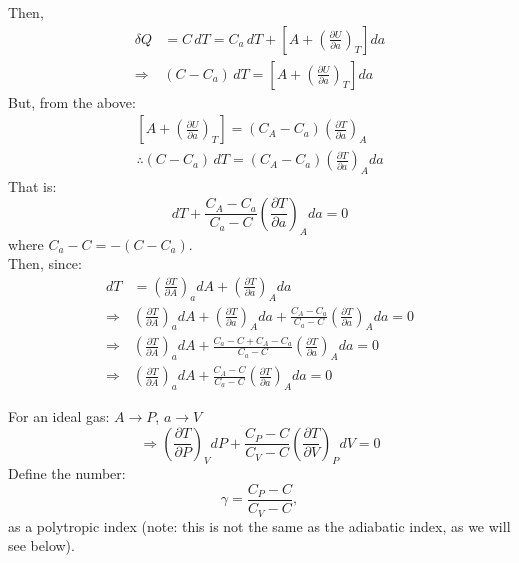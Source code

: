 \documentclass[12pt]{report}
\begin{document}
	Then,
	\begin{align}
		\delta Q &= C\,dT = C_a\,dT + \left[A + \left(\frac{\partial U}{\partial a}\right)_T\right]da \\
		\Rightarrow &(C - C_a)\,dT = \left[A + \left(\frac{\partial U}{\partial a}\right)_T\right]da
	\end{align}
	But, from the above:
	\begin{align}
		\left[A + \left(\frac{\partial U}{\partial a}\right)_T\right] = (C_A - C_a)\left(\frac{\partial T}{\partial a}\right)_A \\
		\therefore \boxed{(C - C_a)\,dT = (C_A - C_a)\left(\frac{\partial T}{\partial a}\right)_Ada }
	\end{align}
	That is:
	\begin{equation}
		dT + \frac{C_A-C_a}{C_a-C}\left(\frac{\partial T}{\partial a}\right)_A da = 0 
	\end{equation}
	where $C_a-C = -(C-C_a)$.\\
	
	Then, since:
	\begin{align}
		dT &= \left(\frac{\partial T}{\partial A}\right)_a dA + \left(\frac{\partial T}{\partial a}\right)_A da  \\
		\Rightarrow &\left(\frac{\partial T}{\partial A}\right)_a dA + \left(\frac{\partial T}{\partial a}\right)_A da + \frac{C_A-C_a}{C_a-C}\left(\frac{\partial T}{\partial a}\right)_A da = 0\nonumber\\
		\Rightarrow &\left(\frac{\partial T}{\partial A}\right)_a dA + \frac{C_a-C+C_A-C_a}{C_a-C}\left(\frac{\partial T}{\partial a}\right)_A da = 0 \nonumber\\
		\Rightarrow &\left(\frac{\partial T}{\partial A}\right)_a dA + \frac{C_A-C}{C_a-C}\left(\frac{\partial T}{\partial a}\right)_A da = 0
	\end{align}
	
	For an ideal gas: $A \rightarrow P$, $a \rightarrow V$ 
	\begin{equation}
		\Rightarrow \left(\frac{\partial T}{\partial P}\right)_V dP + \frac{C_P-C}{C_V-C}\left(\frac{\partial T}{\partial V}\right)_P dV = 0 
	\end{equation} 
	Define the number:
	\begin{equation}
		\gamma = \frac{C_P-C}{C_V-C},
	\end{equation}
	as a polytropic index (note: this is not the same as the adiabatic index, as we will see below).\\
	
\end{document}

